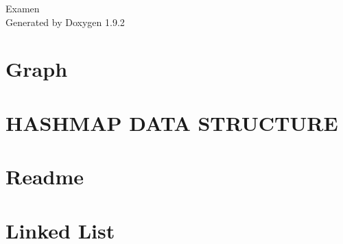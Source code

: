 \documentclass[twoside]{book}
\newcommand{\+}{\discretionary{\mbox{\scriptsize$\hookleftarrow$}}{}{}}
\newcommand{\clearemptydoublepage}{%
    \newpage{\pagestyle{empty}\cleardoublepage}%
  }
\begin{document}
  \raggedbottom
    \hypersetup{pageanchor=false,
                bookmarksnumbered=true,
                pdfencoding=unicode
               }
  \begin{titlepage}
  \vspace*{7cm}
  \begin{center}%
  {\Large Examen}\\
  \vspace*{1cm}
  {\large Generated by Doxygen 1.9.2}\\
  \end{center}
  \end{titlepage}
  \clearemptydoublepage
  \tableofcontents
  \clearemptydoublepage
  \hypersetup{pageanchor=true}
\chapter{Graph}
\label{md_src_main_java_com_thealgorithms_datastructures_graphs__r_e_a_d_m_e}

\chapter{HASHMAP DATA STRUCTURE}
\label{md_src_main_java_com_thealgorithms_datastructures_hashmap__readme}

\chapter{Readme}
\label{md_src_main_java_com_thealgorithms_datastructures_heaps__readme}

\chapter{Linked List}
\label{md_src_main_java_com_thealgorithms_datastructures_lists__r_e_a_d_m_e}

\end{document}
